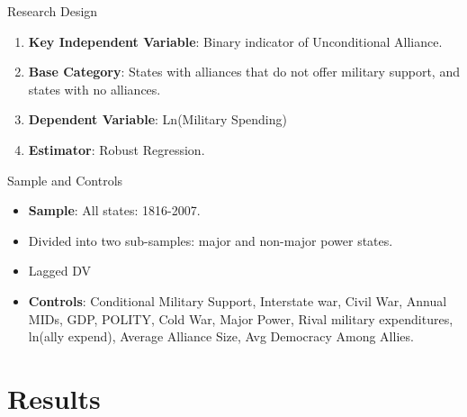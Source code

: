 \documentclass{beamer}
\begin{document}

\begin{frame}{Research Design}

\begin{enumerate}
\item \textbf{Key Independent Variable}: Binary indicator of Unconditional Alliance. 
\pause
\item \textbf{Base Category}: States with alliances that do not offer military support, and states with no alliances. 
\pause
\item \textbf{Dependent Variable}: Ln(Military Spending) 
\pause 
\item \textbf{Estimator}: Robust Regression. 
\end{enumerate}


\end{frame}


\begin{frame}{Sample and Controls}

\begin{itemize}
\item \textbf{Sample}: All states: 1816-2007. 
\pause 
\item Divided into two sub-samples: major and non-major power states. 
\pause
\item Lagged DV
\pause
\item \textbf{Controls}: Conditional Military Support, Interstate war, Civil War, Annual MIDs, GDP, POLITY, Cold War, Major Power, Rival military expenditures, ln(ally expend), Average Alliance Size, Avg Democracy Among Allies. 

\end{itemize} 



\end{frame}


\section{Results}

\end{document}
